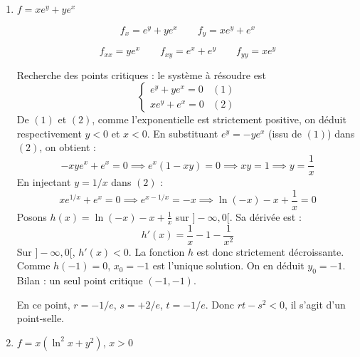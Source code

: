 \documentclass[11pt,a4paper]{article}
\newcommand{\Rr}{\mathbb{R}} \newcommand{\R}{\mathbb{R}}
\renewcommand{\ge}{\geqslant} \renewcommand{\geq}{\geqslant}
\theoremstyle{exostyle}
\begin{document}
\begin{enumerate}
\begin{enumerate}
	\item Étude en $(x,0)$.	
	$r = f_{xx}(x,0)= 0$, 
	$s = f_{xy}(x,0)= 0$, 
	$t = f_{yy}(x,0)= 2x^2(3x+1)$.
	On a $rt-s^2=0$ et le critère de Monge ne permet pas de conclure.
	On étudie $f$ à la main autour de $(x,0)$. On sait que $x^2y^2 \ge 0$, il s'agit donc juste d'étudier 
	$1+3x+2y$ autour de $(x,y)=(x,0)$. Si $x > -\frac13$ alors $1+3x+2y > 0$ autour de $(x,0)$ donc $f(x,y) \sim kx^2y^2$ ($k\in\Rr_+^*$) et ainsi il s'agit d'un minimum local. De même si $x < -\frac13$ il s'agit d'un maximum local.
	En $(-\frac13,0)$ c'est un point-selle.
	
	\item Étude en $(0,y)$.
	De même : maximum local pour $y<-1/2$, minimum local pour $y > -1/2$, point-selle en $y=-1/2$.
	
	\end{enumerate}
	
	

	
	
	\item $f = xe^y + ye^x$
	
	\[
	f_x = e^y + ye^x
	\qquad
	f_y = xe^y + e^x
	\]

	\[
	f_{xx} = ye^x
	\qquad 
	f_{xy}= e^x + e^y
	\qquad 
	f_{yy}= xe^y
	\]
	
	Recherche des points critiques : le système à résoudre est
	\[\begin{cases}     e^y + ye^x = 0 & (1) \\     xe^y + e^x = 0 & (2)     \end{cases}\]
	De $(1)$ et $(2)$, comme l'exponentielle est strictement positive, on déduit respectivement $y < 0$ et $x < 0$. 
	En substituant $e^y = -ye^x$ (issu de $(1)$) dans $(2)$, on obtient :
	\[-xye^x + e^x = 0      \implies e^x(1 - xy) = 0      \implies xy = 1      \implies y = \frac{1}{x}\]
	En injectant $y = 1/x$ dans $(2)$ :
	\[x e^{1/x} + e^x = 0      \implies e^{x - 1/x} = -x      \implies \ln(-x) - x + \frac{1}{x} = 0\]
	Posons $h(x) = \ln(-x) - x + \frac{1}{x}$ sur $]-\infty, 0[$. Sa dérivée est :
	\[h'(x) = \frac{1}{x} - 1 - \frac{1}{x^2}\]
	Sur $]-\infty, 0[$, $h'(x) < 0$. La fonction $h$ est donc strictement décroissante. 
	Comme $h(-1) = 0$, $x_0 = -1$ est l'unique solution. On en déduit $y_0 = -1$. 
	Bilan : un seul point critique $(-1,-1)$.

	En ce point, $r=-1/e$, $s= +2/e$, $t=-1/e$. Donc $rt-s^2 <0$, il s'agit d'un point-selle.	
	
	\item $f = x(\ln^2x + y^2)$, $x>0$
	

\end{enumerate}
\end{document}
